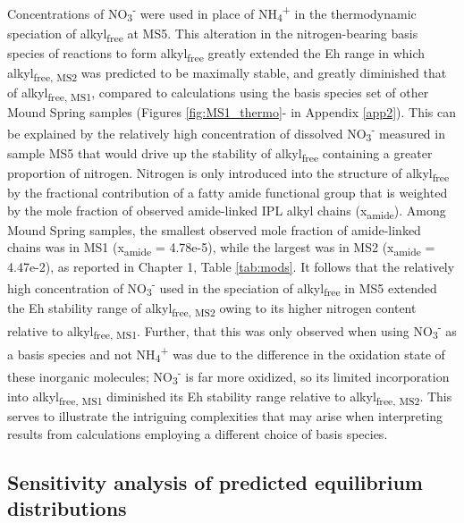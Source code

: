 Concentrations of NO\textsubscript{3}\textsuperscript{-} were used in place of NH\textsubscript{4}\textsuperscript{+} in the thermodynamic speciation of alkyl\textsubscript{free} at MS5. This alteration in the nitrogen-bearing basis species of reactions to form alkyl\textsubscript{free} greatly extended the Eh range in which alkyl\textsubscript{free, MS2} was predicted to be maximally stable, and greatly diminished that of alkyl\textsubscript{free, MS1}, compared to calculations using the basis species set of other Mound Spring samples (Figures \ref{fig:MS1_thermo}- in Appendix \ref{app2}). This can be explained by the relatively high concentration of dissolved NO\textsubscript{3}\textsuperscript{-} measured in sample MS5 that would drive up the stability of alkyl\textsubscript{free} containing a greater proportion of nitrogen. Nitrogen is only introduced into the structure of alkyl\textsubscript{free} by the fractional contribution of a fatty amide functional group that is weighted by the mole fraction of observed amide-linked IPL alkyl chains (x\textsubscript{amide}). Among Mound Spring samples, the smallest observed mole fraction of amide-linked chains was in MS1 (x\textsubscript{amide} = 4.78e-5), while the largest was in MS2 (x\textsubscript{amide} = 4.47e-2), as reported in Chapter 1, Table \ref{tab:mods}. It follows that the relatively high concentration of NO\textsubscript{3}\textsuperscript{-} used in the speciation of alkyl\textsubscript{free} in MS5 extended the Eh stability range of alkyl\textsubscript{free, MS2} owing to its higher nitrogen content relative to alkyl\textsubscript{free, MS1}. Further, that this was only observed when using NO\textsubscript{3}\textsuperscript{-} as a basis species and not NH\textsubscript{4}\textsuperscript{+} was due to the difference in the oxidation state of these inorganic molecules; NO\textsubscript{3}\textsuperscript{-} is far more oxidized, so its limited incorporation into alkyl\textsubscript{free, MS1} diminished its Eh stability range relative to alkyl\textsubscript{free, MS2}. This serves to illustrate the intriguing complexities that may arise when interpreting results from calculations employing a different choice of basis species.


\subsection{Sensitivity analysis of predicted equilibrium distributions}

